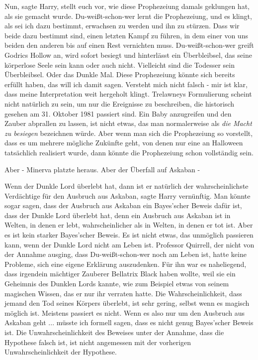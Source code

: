 \glqq{}Nun\grqq{}, sagte Harry, \glqq{}stellt euch vor, wie diese Prophezeiung
damals geklungen hat, als sie gemacht wurde. Du-weißt-schon-wer lernt die
Prophezeiung, und es klingt, als sei ich dazu bestimmt, erwachsen zu werden und
ihn zu stürzen. Dass wir beide dazu bestimmt sind, einen letzten Kampf zu
führen, in dem einer von uns beiden den anderen bis auf einen Rest vernichten
muss. Du-weißt-schon-wer greift Godrics Hollow an, wird sofort besiegt und
hinterlässt ein Überbleibsel, das seine körperlose Seele sein kann oder auch
nicht. Vielleicht sind die Todesser sein Überbleibsel. Oder das Dunkle Mal.
Diese Prophezeiung könnte sich bereits erfüllt haben, das will ich damit sagen.
Versteht mich nicht falsch - mir ist klar, dass meine Interpretation weit
hergeholt klingt. Trelawneys Formulierung scheint nicht natürlich zu sein, um
nur die Ereignisse zu beschreiben, die historisch gesehen am 31. Oktober 1981
passiert sind. Ein Baby anzugreifen und den Zauber abprallen zu lassen, ist
nicht etwas, das man normalerweise als \emph{\glqq{}die Macht zu besiegen}\grqq{}
bezeichnen würde. Aber wenn man sich die Prophezeiung so vorstellt, dass es um
mehrere mögliche Zukünfte geht, von denen nur eine an Halloween tatsächlich
realisiert wurde, dann könnte die Prophezeiung schon vollständig sein.\grqq{}

\glqq{}Aber -\grqq{} Minerva platzte heraus. \glqq{}Aber der Überfall auf Askaban
-\grqq{}

\glqq{}Wenn der Dunkle Lord überlebt hat, dann ist er natürlich der
wahrscheinlichste Verdächtige für den Ausbruch aus Askaban\grqq{}, sagte Harry
vernünftig. \glqq{}Man könnte sogar sagen, dass der Ausbruch aus Askaban ein
Bayes'scher Beweis dafür ist, dass der Dunkle Lord überlebt hat, denn ein
Ausbruch aus Askaban ist in Welten, in denen er lebt, wahrscheinlicher als in
Welten, in denen er tot ist. Aber es ist kein starker Bayes'scher Beweis. Es ist
nicht etwas, das unmöglich passieren kann, wenn der Dunkle Lord nicht am Leben
ist. Professor Quirrell, der nicht von der Annahme ausging, dass
Du-weißt-schon-wer noch am Leben ist, hatte keine Probleme, sich eine eigene
Erklärung auszudenken. Für ihn war es naheliegend, dass irgendein mächtiger
Zauberer Bellatrix Black haben wollte, weil sie ein Geheimnis des Dunklen Lords
kannte, wie zum Beispiel etwas von seinem magischen Wissen, das er nur ihr
verraten hatte. Die Wahrscheinlichkeit, dass jemand den Tod seines Körpers
überlebt, ist sehr gering, selbst wenn es magisch möglich ist. Meistens passiert
es nicht. Wenn es also nur um den Ausbruch aus Askaban geht ... müsste ich
formell sagen, dass es nicht genug Bayes'scher Beweis ist. Die
Unwahrscheinlichkeit des Beweises unter der Annahme, dass die Hypothese falsch
ist, ist nicht angemessen mit der vorherigen Unwahrscheinlichkeit der
Hypothese.\grqq{}


